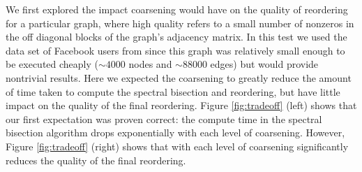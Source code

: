\documentclass[11pt]{article}
\begin{document}
We first explored the impact coarsening would have on the quality of reordering
for a particular graph, where high quality refers to a small number of nonzeros in the
off diagonal blocks of the graph's adjacency matrix. In this test we used the
data set of Facebook users from \cite{facebook,snapnets} since this graph was
relatively small enough to be executed cheaply ($\sim 4000$ nodes and $\sim
88000$ edges) but would provide nontrivial results. Here we expected the
coarsening to greatly reduce the amount of time taken to compute the spectral
bisection and reordering, but have little impact on the quality of the final
reordering. Figure \ref{fig:tradeoff} (left) shows that our first expectation was
proven correct: the compute time in the spectral bisection algorithm drops
exponentially with each level of coarsening. However, Figure \ref{fig:tradeoff}
(right) shows that with each level of coarsening significantly reduces the quality of
the final reordering. 
\end{document}

